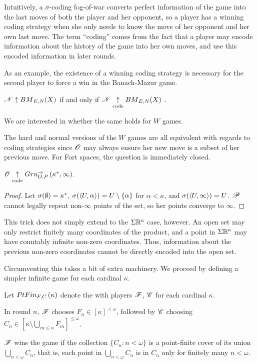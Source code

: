 Intuitively, a $\sigma$-coding fog-of-war converts perfect information of the
game into the last moves of both the player and her opponent, so a player has
a winning coding strategy when she only needs to know the move of her opponent
and her own last move. The term ``coding'' comes from the fact
that a player may encode information about the history of the game into
her own moves, and use this encoded information in later rounds.

As an example, the existence of a winning coding strategy is necessary for the
second player to force a win in the Banach-Mazur game.

\begin{thm}\label{bmcode}
  $\mathscr{N}\uparrow{BM}_{E,N}(X)$ if and only if $\mathscr{N}\underset{\text{code}}{\uparrow}{BM}_{E,N}(X)$
  \cite{MR817083} \cite{MR831181}.
\end{thm}

We are interested in whether the same holds for $W$ games.

The hard and normal versions of the $W$ games are all equivalent with regards
to coding strategies since $\mathscr{O}$
may always ensure her new move is a subset of her previous move. For
Fort spaces, the question is immediately closed.

\begin{prop}
  $\mathscr{O} \underset{\text{code}}{\uparrow} Gru_{O,P}^{\to}\left({\kappa^*},{\infty}\right)$.
\end{prop}

\begin{proof}
  Let $\sigma(\emptyset)=\kappa^*$,
  $\sigma(\langle U,\alpha\rangle)=U\setminus\{\alpha\}$ for $\alpha<\kappa$,
  and $\sigma(\langle U,\infty\rangle)=U$. $\mathscr{P}$
  cannot legally repeat non-$\infty$ points of the set, so her points converge
  to $\infty$.
\end{proof}

This trick does not simply extend to the $\Sigma\mathbb{R}^{\kappa}$ case, however.
An open set may only restrict finitely many coordinates of the product,
and a point in $\Sigma\mathbb{R}^{\kappa}$ may have countably infinite non-zero
coordinates. Thus, information about the previous non-zero coordinates cannot be
directly encoded into the open set.

Circumventing this takes a bit of extra machinery. We proceed by defining
a simpler infinite game for each cardinal $\kappa$.

\begin{game}
  Let $PtFin_{F,C}\left({\kappa}\right)$ denote the  with players
  $\mathscr{F}$, $\mathscr{C}$ for each cardinal $\kappa$.

  In round $n$, $\mathscr{F}$ chooses $F_n\in[\kappa]^{<\omega}$, followed by
  $\mathscr{C}$ choosing $C_n\in[\kappa\setminus\bigcup_{m\leq n}F_m]^{\leq\omega}$.

  $\mathscr{F}$ wins the game if the collection $\{C_n:n<\omega\}$ is a point-finite
  cover of its union $\bigcup_{n<\omega} C_n$, that is, each point in
  $\bigcup_{n<\omega} C_n$ is in $C_n$ only for finitely many $n<\omega$.
\end{game}

